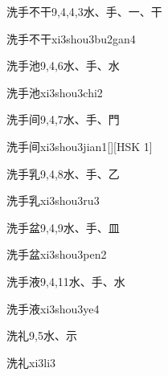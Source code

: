\begin{entry}{洗手不干}{9,4,4,3}{⽔、⼿、⼀、⼲}
  \begin{phonetics}{洗手不干}{xi3shou3bu2gan4}
  \end{phonetics}
\end{entry}

\begin{entry}{洗手池}{9,4,6}{⽔、⼿、⽔}
  \begin{phonetics}{洗手池}{xi3shou3chi2}
  \end{phonetics}
\end{entry}

\begin{entry}{洗手间}{9,4,7}{⽔、⼿、⾨}
  \begin{phonetics}{洗手间}{xi3shou3jian1}[][HSK 1]
  \end{phonetics}
\end{entry}

\begin{entry}{洗手乳}{9,4,8}{⽔、⼿、⼄}
  \begin{phonetics}{洗手乳}{xi3shou3ru3}
  \end{phonetics}
\end{entry}

\begin{entry}{洗手盆}{9,4,9}{⽔、⼿、⽫}
  \begin{phonetics}{洗手盆}{xi3shou3pen2}
  \end{phonetics}
\end{entry}

\begin{entry}{洗手液}{9,4,11}{⽔、⼿、⽔}
  \begin{phonetics}{洗手液}{xi3shou3ye4}
  \end{phonetics}
\end{entry}

\begin{entry}{洗礼}{9,5}{⽔、⽰}
  \begin{phonetics}{洗礼}{xi3li3}
  \end{phonetics}
\end{entry}

